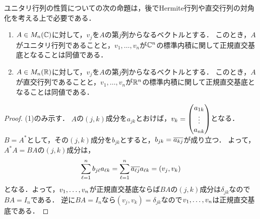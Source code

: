 ユニタリ行列の性質についての次の命題は，後でHermite行列や直交行列の対角化を考える上で必要である．
\begin{prop}\label{prop:unitary_matrix}
\begin{enumerate}
  \item $A \in M_n(\mathbb{C})$に対して，$v_j$を$A$の第$j$列からなるベクトルとする．
  このとき，$A$がユニタリ行列であることと，$v_1,\dots,v_n$が$\mathbb{C}^n$の標準内積に関して正規直交基底となることは同値である．
  \item $A \in M_n(\mathbb{R})$に対して，$v_j$を$A$の第$j$列からなるベクトルとする．
  このとき，$A$が直交行列であることと，$v_1,\dots,v_n$が$\mathbb{R}^n$の標準内積に関して正規直交基底となることは同値である．
\end{enumerate}
\end{prop}
\begin{proof}
(1)のみ示す．
$A$の$(j,k)$成分を$a_{jk}$とおけば，$v_k = \begin{pmatrix} a_{1k} \\ \vdots \\ a_{nk} \end{pmatrix}$となる．
$B=A^\ast$として，その$(j,k)$成分を$b_{jk}$とすると，$b_{jk} = \overline{a_{kj}}$が成り立つ．
よって，$A^\ast A=BA$の$(j,k)$成分は，
\[
  \sum_{\ell=1}^n b_{j\ell} a_{\ell k} = \sum_{\ell=1}^n \overline{a_{\ell j}} a_{\ell k} = (v_j,v_k)
\]
となる．よって，$v_{1},\dots,v_{n}$が正規直交基底ならば$BA$の$(j,k)$成分は$\delta_{jk}$なので$BA = I_n$である．
逆に$BA = I_n$なら$(v_j,v_k) = \delta_{jk}$なので$v_{1},\dots,v_{n}$は正規直交基底である．
\end{proof}
